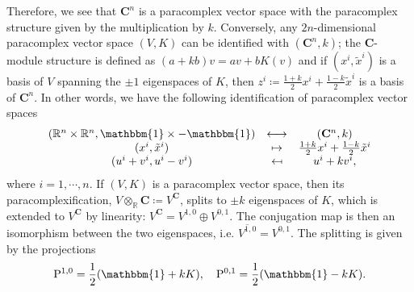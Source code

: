 \documentclass{article}
\newcommand{\Cc}{\mathbf{C}}
\newcommand{\RR}{\mathbb{R}}
\newcommand{\PP}{\mathrm{P}}
\newcommand{\id}{\mathbbm{1}}
\newcommand{\xt}{{\tilde{x}}}
\theoremstyle{definition}
\theoremstyle{remark}
\begin{document}
Therefore, we see that $\mathbf{C}^n$ is a paracomplex vector space with the paracomplex structure given by the multiplication by $k$. Conversely, any $2n$-dimensional paracomplex vector space $(V,K)$ can be identified with $(\mathbf{C}^n,k)$; the $\mathbf{C}$-module structure is defined as $(a+kb)v=av+bK(v)$ and if $(x^i, \xt^i)$ is a basis of $V$ spanning the $\pm 1$ eigenspaces of $K$, then $z^i\coloneqq \frac{1+k}{2}x^i+\frac{1-k}{2}\xt^i$ is a basis of $\Cc^n$. In other words, we have the following identification of paracomplex vector spaces
\begin{align}\label{para-complexification}
\begin{aligned}
\begin{array}{ccc}
(\RR^n\times\RR^n,\id \times -\id) &\longleftrightarrow &(\Cc^n, k)\\
(x^i,\xt^i) &\mapsto &\frac{1+k}{2}x^i+\frac{1-k}{2}\xt^i\\
(u^i+v^i,u^i-v^i) &\mapsfrom &u^i+kv^i,
\end{array}
\end{aligned}
\end{align}
where $i=1,\cdots,n$. If $(V,K)$ is a paracomplex vector space, then its paracomplexification, $V\otimes_\mathbb{R} \mathbf{C}\coloneqq V^\Cc$, splits to $\pm k$ eigenspaces of $K$, which is extended to $V^\Cc$ by linearity: $V^\Cc=V^{1,0}\oplus V^{0,1}$. The conjugation map is then an isomorphism between the two eigenspaces, i.e. $\overline{{V^{1,0}}}=V^{0,1}$. The splitting is given by the projections
\begin{align}
\PP^{1,0}=\frac{1}{2}(\id +kK),\quad \PP^{0,1}=\frac{1}{2}(\id -kK). \label{eq:projections_parac}
\end{align}
\end{document}
